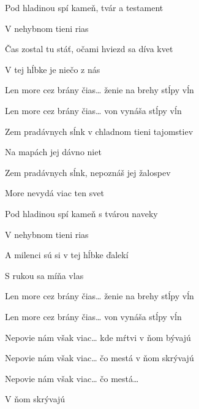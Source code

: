 \begin{song}
\bigskip

Pod hladinou spí kameň, tvár a testament \par
{}V nehybnom tieni rias \par
Čas zostal tu stáť, očami hviezd sa díva kvet \par
V tej hĺbke je niečo z nás \par

\bigskip

Len more cez brány čias… ženie na brehy stĺpy vĺn \par
Len more cez brány čias… von vynáša stĺpy vĺn \par

\bigskip

 \par

\bigskip

Zem pradávnych sĺnk v chladnom tieni tajomstiev \par
Na mapách jej dávno niet \par
Zem pradávnych sĺnk, nepoznáš jej žalospev \par
More nevydá viac ten svet \par

\bigskip

Pod hladinou spí kameň s tvárou naveky \par
{}V nehybnom tieni rias \par
A milenci sú si v tej hĺbke ďalekí \par
{}S rukou sa míňa vlas \par

\bigskip

Len more cez brány čias… ženie na brehy stĺpy vĺn \par
Len more cez brány čias… von vynáša stĺpy vĺn \par
{}Nepovie nám však viac… kde mŕtvi v ňom bývajú \par
{}Nepovie nám však viac… čo mestá v ňom skrývajú \par
{}Nepovie nám však viac… čo mestá… \par
V ňom skrývajú  \par

\end{song}